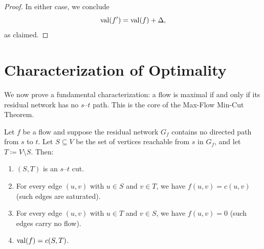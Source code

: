 \documentclass[11pt]{article}
\begin{document}
\begin{proof}
In either case, we conclude
\[
  \mathrm{val}(f') = \mathrm{val}(f) + \Delta,
\]
as claimed.
\end{proof}

\section{Characterization of Optimality}

We now prove a fundamental characterization: a flow is maximal if and only if
its residual network has no $s$--$t$ path. This is the core of the
Max-Flow Min-Cut Theorem.

\begin{lemma}\label{lem:no-aug-cut}
Let $f$ be a flow and suppose the residual network $G_f$ contains no directed
path from $s$ to $t$. Let $S\subseteq V$ be the set of vertices reachable from
$s$ in $G_f$, and let $T\coloneqq V\setminus S$. Then:
\begin{enumerate}[label=(\alph*), itemsep=0.2em]
  \item $(S,T)$ is an $s$--$t$ cut.
  \item For every edge $(u,v)$ with $u\in S$ and $v\in T$, we have
  $f(u,v)=c(u,v)$ (such edges are saturated).
  \item For every edge $(u,v)$ with $u\in T$ and $v\in S$, we have
  $f(u,v)=0$ (such edges carry no flow).
  \item $\mathrm{val}(f) = c(S,T)$.
\end{enumerate}
\end{lemma}
\end{document}
